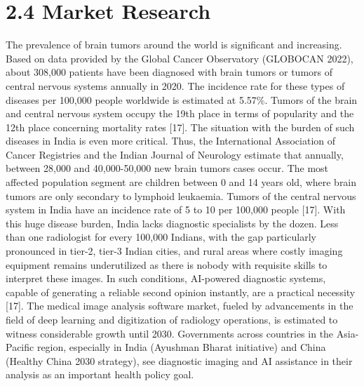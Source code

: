 \documentclass[12pt,a4paper,oneside]{report}
\begin{document}
\section*{2.4 Market Research}
The prevalence of brain tumors around the world is significant and increasing. Based on data provided by the Global Cancer Observatory (GLOBOCAN 2022), about 308,000 patients have been diagnosed with brain tumors or tumors of central nervous systems annually in 2020. The incidence rate for these types of diseases per 100,000 people worldwide is estimated at 5.57\%. Tumors of the brain and central nervous system occupy the 19th place in terms of popularity and the 12th place concerning mortality rates [17].
The situation with the burden of such diseases in India is even more critical. Thus, the International Association of Cancer Registries and the Indian Journal of Neurology estimate that annually, between 28,000 and 40,000-50,000 new brain tumors cases occur. The most affected population segment are children between 0 and 14 years old, where brain tumors are only secondary to lymphoid leukaemia. Tumors of the central nervous system in India have an incidence rate of 5 to 10 per 100,000 people [17].
With this huge disease burden, India lacks diagnostic specialists by the dozen. Less than one radiologist for every 100,000 Indians, with the gap particularly pronounced in tier-2, tier-3 Indian cities, and rural areas where costly imaging equipment remains underutilized as there is nobody with requisite skills to interpret these images. In such conditions, AI-powered diagnostic systems, capable of generating a reliable second opinion instantly, are a practical necessity [17].
The medical image analysis software market, fueled by advancements in the field of deep learning and digitization of radiology operations, is estimated to witness considerable growth until 2030. Governments across countries in the Asia-Pacific region, especially in India (Ayushman Bharat initiative) and China (Healthy China 2030 strategy), see diagnostic imaging and AI assistance in their analysis as an important health policy goal.
\end{document}
